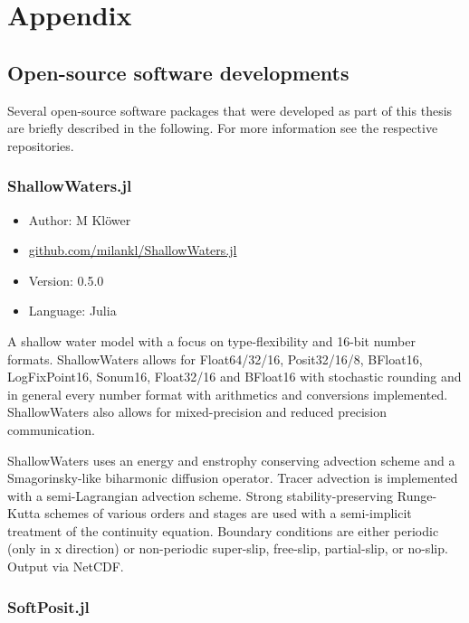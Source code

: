 \chapter{Appendix}
\renewcommand{\thechapter}{A}

\section{Open-source software developments}
\label{sec:open}

Several open-source software packages that were developed as part of this thesis are briefly described in the following. For more information
see the respective repositories.

\subsection{ShallowWaters.jl}

\begin{itemize}
    \setlength\itemsep{-5pt}
    \item Author: M Klöwer
    \item \href{https://github.com/milankl/ShallowWaters.jl}{github.com/milankl/ShallowWaters.jl}
    \item Version: 0.5.0
    \item Language: Julia
\end{itemize}

A shallow water model with a focus on type-flexibility and 16-bit number formats. ShallowWaters allows for Float64/32/16, Posit32/16/8, BFloat16,
LogFixPoint16, Sonum16, Float32/16 and BFloat16 with stochastic rounding and in general every number format with arithmetics and conversions
implemented. ShallowWaters also allows for mixed-precision and reduced precision communication.

ShallowWaters uses an energy and enstrophy conserving advection scheme and a Smagorinsky-like biharmonic diffusion operator. Tracer advection
is implemented with a semi-Lagrangian advection scheme. Strong stability-preserving Runge-Kutta schemes of various orders and stages are used
with a semi-implicit treatment of the continuity equation. Boundary conditions are either periodic (only in x direction) or non-periodic super-slip, free-slip,
partial-slip, or no-slip. Output via NetCDF.

\subsection{SoftPosit.jl}

